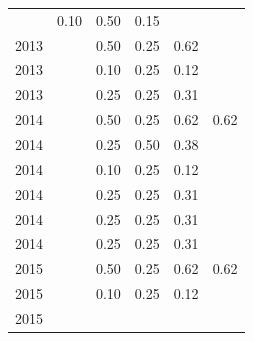 \begin{table}[H]
\begin{tabular}{| l | c | c | c | c | c |}
          &
          0.10
          &
          0.50
          &
          0.15
          &
          \\
            2013
          &
          
          &
          0.50
          &
          0.25
          &
          0.62
          &
          \\
            2013
          &
          
          &
          0.10
          &
          0.25
          &
          0.12
          &
          \\
            2013
          &
          
          &
          0.25
          &
          0.25
          &
          0.31
          &
          \\
\hline
            2014
          &
          
          &
          0.50
          &
          0.25
          &
          0.62
          &
            {\color{blue} 0.62}
          \\
            2014
          &
          
          &
          0.25
          &
          0.50
          &
          0.38
          &
          \\
            2014
          &
          
          &
          0.10
          &
          0.25
          &
          0.12
          &
          \\
            2014
          &
          
          &
          0.25
          &
          0.25
          &
          0.31
          &
          \\
            2014
          &
          
          &
          0.25
          &
          0.25
          &
          0.31
          &
          \\
            2014
          &
          
          &
          0.25
          &
          0.25
          &
          0.31
          &
          \\
\hline
            2015
          &
          
          &
          0.50
          &
          0.25
          &
          0.62
          &
            {\color{blue} 0.62}
          \\
            2015
          &
          
          &
          0.10
          &
          0.25
          &
          0.12
          &
          \\
            2015
          &
          

\end{tabular}
\end{table}
